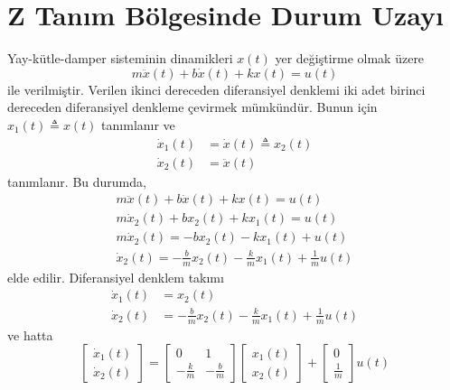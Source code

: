 \chapter{Z Tanım Bölgesinde Durum Uzayı}

Yay-kütle-damper sisteminin dinamikleri $x(t)$ yer değiştirme olmak üzere
\begin{equation}
    m\ddot{x}(t)+b\dot{x}(t)+kx(t)=u(t)
\end{equation}
ile verilmiştir. Verilen ikinci dereceden diferansiyel denklemi iki adet birinci dereceden diferansiyel denkleme çevirmek mümkündür. Bunun için $x_1(t)\triangleq x(t)$ tanımlanır ve
\begin{equation}
\begin{split}
    \dot{x}_1(t)&=\dot{x}(t)\triangleq x_2(t)\\
    \dot{x}_2(t)&=\ddot{x}(t)
\end{split}
\end{equation}
tanımlanır. Bu durumda,
\begin{equation}
    \begin{split}
        m\ddot{x}(t)+b\dot{x}(t)+kx(t)=u(t)\\
        m\dot{x}_2(t)+bx_2(t)+kx_1(t)=u(t)\\
        m\dot{x}_2(t)=-bx_2(t)-kx_1(t)+u(t)\\
        \dot{x}_2(t)=-\frac{b}{m}x_2(t)-\frac{k}{m}x_1(t)+\frac{1}{m}u(t)
    \end{split}
\end{equation}
elde edilir. Diferansiyel denklem takımı
\begin{equation}
    \begin{split}
        \dot{x}_1(t)&=x_2(t)\\
        \dot{x}_2(t)&=-\frac{b}{m}x_2(t)-\frac{k}{m}x_1(t)+\frac{1}{m}u(t)
    \end{split}
\end{equation}
ve hatta 
\begin{equation}
    \begin{bmatrix}
        \dot{x}_1(t)\\
        \dot{x}_2(t)
    \end{bmatrix}=
    \begin{bmatrix}
        0& 1\\
        -\frac{k}{m}& -\frac{b}{m}
    \end{bmatrix}\begin{bmatrix}
        x_1(t)\\
        x_2(t)
    \end{bmatrix}+\begin{bmatrix}
        0\\
        \frac{1}{m}
    \end{bmatrix}u(t)
\end{equation}
